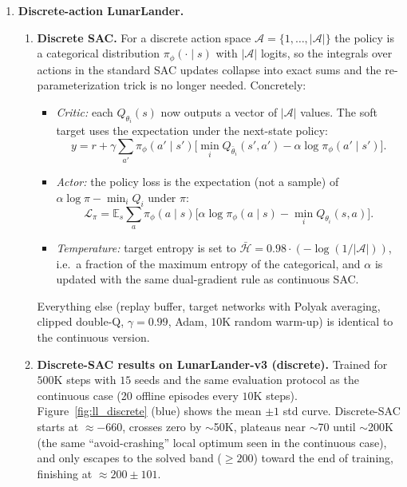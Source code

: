 \documentclass[12pt]{scrartcl}
\begin{document}
\begin{enumerate}
    \item \textbf{Discrete-action LunarLander.}
    \begin{enumerate}[label=(\alph*)]
        \item \textbf{Discrete SAC.} For a discrete action space $\mathcal{A}=\{1,\ldots,|\mathcal{A}|\}$ the policy is a categorical distribution $\pi_\phi(\cdot\mid s)$ with $|\mathcal{A}|$ logits, so the integrals over actions in the standard SAC updates collapse into exact sums and the re-parameterization trick is no longer needed. Concretely:
        \begin{itemize}
            \item \emph{Critic:} each $Q_{\theta_i}(s)$ now outputs a vector of $|\mathcal{A}|$ values. The soft target uses the expectation under the next-state policy: \\
            \[
              y = r + \gamma \sum_{a'} \pi_{\phi}(a'\mid s')\Big[\min_i Q_{\bar\theta_i}(s', a') - \alpha \log \pi_\phi(a'\mid s')\Big].
            \]
            \item \emph{Actor:} the policy loss is the expectation (not a sample) of $\alpha\log\pi - \min_i Q_i$ under $\pi$: \\
            \[
              \mathcal{L}_\pi = \mathbb{E}_{s}\!\sum_a \pi_\phi(a\mid s)\big[\alpha\log\pi_\phi(a\mid s) - \min_i Q_{\theta_i}(s,a)\big].
            \]
            \item \emph{Temperature:} target entropy is set to $\bar{\mathcal{H}} = 0.98\cdot(-\log(1/|\mathcal{A}|))$, i.e.\ a fraction of the maximum entropy of the categorical, and $\alpha$ is updated with the same dual-gradient rule as continuous SAC.
        \end{itemize}
        Everything else (replay buffer, target networks with Polyak averaging, clipped double-Q, $\gamma=0.99$, Adam, $10$K random warm-up) is identical to the continuous version.

        \item \textbf{Discrete-SAC results on LunarLander-v3 (discrete).} Trained for $500$K steps with $15$ seeds and the same evaluation protocol as the continuous case (20 offline episodes every $10$K steps). Figure~\ref{fig:ll_discrete} (blue) shows the mean $\pm 1$ std curve. Discrete-SAC starts at $\approx -660$, crosses zero by $\sim$50K, plateaus near $\sim$70 until $\sim$200K (the same ``avoid-crashing'' local optimum seen in the continuous case), and only escapes to the solved band ($\geq 200$) toward the end of training, finishing at $\approx 200 \pm 101$.


\end{enumerate}
\end{enumerate}
\end{document}
